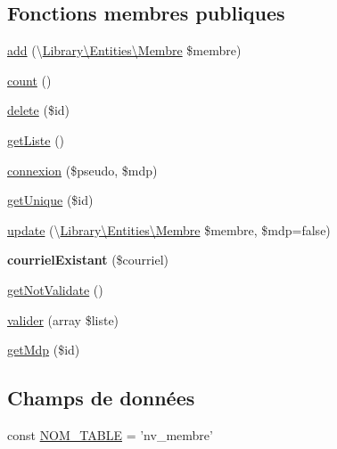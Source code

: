 \subsection*{Fonctions membres publiques}
\begin{DoxyCompactItemize}
\item 
\hyperlink{class_library_1_1_models_1_1_membre_manager___p_d_o_af804544a7b5bdf26b8ff64e2067768ec}{add} (\textbackslash{}\hyperlink{class_library_1_1_entities_1_1_membre}{Library\textbackslash{}\+Entities\textbackslash{}\+Membre} \$membre)
\item 
\hyperlink{class_library_1_1_models_1_1_membre_manager___p_d_o_ac751e87b3d4c4bf2feb03bee8b092755}{count} ()
\item 
\hyperlink{class_library_1_1_models_1_1_membre_manager___p_d_o_a2f8258add505482d7f00ea26493a5723}{delete} (\$id)
\item 
\hyperlink{class_library_1_1_models_1_1_membre_manager___p_d_o_a20b3a2f576f3ea746f769779a329491e}{get\+Liste} ()
\item 
\hyperlink{class_library_1_1_models_1_1_membre_manager___p_d_o_aa564555e5f523593ac65f5209c900bfd}{connexion} (\$pseudo, \$mdp)
\item 
\hyperlink{class_library_1_1_models_1_1_membre_manager___p_d_o_ab94c8b937a2aa55fce0bb7f77f68c00e}{get\+Unique} (\$id)
\item 
\hyperlink{class_library_1_1_models_1_1_membre_manager___p_d_o_a8237876cfd9696bc2f93e2d67d23640b}{update} (\textbackslash{}\hyperlink{class_library_1_1_entities_1_1_membre}{Library\textbackslash{}\+Entities\textbackslash{}\+Membre} \$membre, \$mdp=false)
\item 
\hypertarget{class_library_1_1_models_1_1_membre_manager___p_d_o_aea0f712c0b27fbe5644ca17cc4dca6aa}{{\bfseries courriel\+Existant} (\$courriel)}\label{class_library_1_1_models_1_1_membre_manager___p_d_o_aea0f712c0b27fbe5644ca17cc4dca6aa}

\item 
\hyperlink{class_library_1_1_models_1_1_membre_manager___p_d_o_a779790ed69a6d4db56de26e189202ecb}{get\+Not\+Validate} ()
\item 
\hyperlink{class_library_1_1_models_1_1_membre_manager___p_d_o_aa6b82e38583e652b2506a45dce4b5480}{valider} (array \$liste)
\item 
\hyperlink{class_library_1_1_models_1_1_membre_manager___p_d_o_a429b6cd9fcd955208060b4601c205393}{get\+Mdp} (\$id)
\end{DoxyCompactItemize}
\subsection*{Champs de données}
\begin{DoxyCompactItemize}
\item 
const \hyperlink{class_library_1_1_models_1_1_membre_manager___p_d_o_a243755033f10b0817aa9d990cc252817}{N\+O\+M\+\_\+\+T\+A\+B\+L\+E} = 'nv\+\_\+membre'
\end{DoxyCompactItemize}

